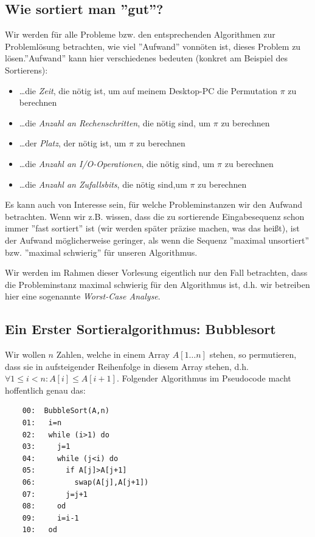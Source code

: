 \documentclass{article}
\begin{document}
\subsection{Wie sortiert man ''gut''?}
Wir werden für alle Probleme bzw. den entsprechenden Algorithmen zur Problemlösung
betrachten, wie viel ''Aufwand'' vonnöten ist, dieses Problem zu lösen.''Aufwand'' kann 
hier verschiedenes bedeuten (konkret am Beispiel des Sortierens):

\begin{itemize}
\item \dots die \emph{Zeit}, die nötig ist, um auf meinem Desktop-PC die Permutation $\pi$ zu berechnen 
\item \dots die \emph{Anzahl an Rechenschritten}, die nötig sind, um $\pi$ zu berechnen
\item \dots der \emph{Platz}, der nötig ist, um $\pi$ zu berechnen
\item \dots die \emph{Anzahl an I/O-Operationen}, die nötig sind, um $\pi$ zu berechnen
\item \dots die \emph{Anzahl an Zufallsbits}, die nötig sind,um $\pi$ zu berechnen
\end{itemize}

Es kann auch von Interesse sein, für welche Probleminstanzen wir den Aufwand betrachten.
Wenn wir z.B. wissen, dass die zu sortierende Eingabesequenz schon immer ''fast sortiert''
ist (wir werden später präzise machen, was das heißt), ist der Aufwand möglicherweise
geringer, als wenn die Sequenz ''maximal unsortiert'' bzw. ''maximal schwierig'' für unseren Algorithmus.

Wir werden im Rahmen dieser Vorlesung eigentlich nur den Fall betrachten, dass die Probleminstanz
maximal schwierig für den Algorithmus ist, d.h. wir betreiben hier eine sogenannte 
\emph{Worst-Case Analyse}.

\subsection{Ein Erster Sortieralgorithmus: Bubblesort}
Wir wollen $n$ Zahlen, welche in einem Array $A[1\dots n]$ stehen, so permutieren, dass sie in
aufsteigender Reihenfolge in diesem Array stehen, d.h. $\forall 1\leq i<n: A[i]\leq A[i+1]$.
Folgender Algorithmus im Pseudocode macht hoffentlich genau das:

\begin{verbatim}
	00:  BubbleSort(A,n)
	01:   i=n
	02:   while (i>1) do
	03:     j=1
	04:     while (j<i) do
	05:       if A[j]>A[j+1]
	06:         swap(A[j],A[j+1])
	07:       j=j+1
	08:     od
	09:     i=i-1
	10:   od
\end{verbatim}
\end{document}
